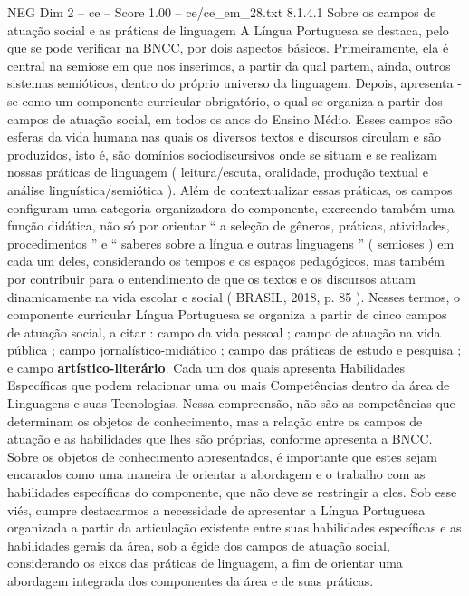 \begin{textsample}{NEG Dim 2 – ce – Score 1.00 – ce/ce\_em\_28.txt}  \label{ex:f2_neg_207}
8.1.4.1 Sobre os campos de atuação social e as práticas de linguagem A Língua Portuguesa se destaca, pelo que se pode verificar na BNCC, por dois aspectos básicos.
Primeiramente, ela é central na semiose em que nos inserimos, a partir da qual partem, ainda, outros sistemas semióticos, dentro do próprio universo da linguagem.
Depois, apresenta -se como um componente curricular obrigatório, o qual se organiza a partir dos campos de atuação social, em todos os anos do Ensino Médio.
Esses campos são esferas da vida humana nas quais os diversos textos e discursos circulam e são produzidos, isto é, são domínios sociodiscursivos onde se situam e se realizam nossas práticas de linguagem ( leitura/escuta, oralidade, produção textual e análise linguística/semiótica ).
Além de contextualizar essas práticas, os campos configuram uma categoria organizadora do componente, exercendo também uma função didática, não só por orientar “ a seleção de gêneros, práticas, atividades, procedimentos ” e “ saberes sobre a língua e outras linguagens ” ( semioses ) em cada um deles, considerando os tempos e os espaços pedagógicos, mas também por contribuir para o entendimento de que os textos e os discursos atuam dinamicamente na vida escolar e social ( BRASIL, 2018, p. 85 ).
Nesses termos, o componente curricular Língua Portuguesa se organiza a partir de cinco campos de atuação social, a citar : campo da vida pessoal ; campo de atuação na vida pública ; campo jornalístico-midiático ; campo das práticas de estudo e pesquisa ; e campo \textbf{artístico-literário}.
Cada um dos quais apresenta Habilidades Específicas que podem relacionar uma ou mais Competências dentro da área de Linguagens e suas Tecnologias.
Nessa compreensão, não são as competências que determinam os objetos de conhecimento, mas a relação entre os campos de atuação e as habilidades que lhes são próprias, conforme apresenta a BNCC.
Sobre os objetos de conhecimento apresentados, é importante que estes sejam encarados como uma maneira de orientar a abordagem e o trabalho com as habilidades específicas do componente, que não deve se restringir a eles.
Sob esse viés, cumpre destacarmos a necessidade de apresentar a Língua Portuguesa organizada a partir da articulação existente entre suas habilidades específicas e as habilidades gerais da área, sob a égide dos campos de atuação social, considerando os eixos das práticas de linguagem, a fim de orientar uma abordagem integrada dos componentes da área e de suas práticas.

\end{textsample}
